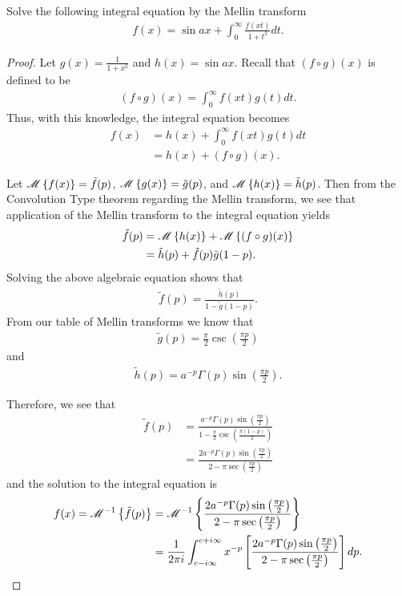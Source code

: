 \begin{problem}{3}
  Solve the following integral equation by the Mellin transform
  \begin{align*}
    f(x) = \sin ax + \int_0^\infty \frac{f(xt)}{1 + t^2} dt.
  \end{align*}
\end{problem}

\begin{proof}
  Let $\displaystyle g(x) = \frac{1}{1+ x^2}$ and $h(x) = \sin ax$. Recall that $(f \circ g)(x)$
  is defined to be
  \begin{align*}
    (f \circ g)(x) = \int_0^\infty f(xt) g(t) dt.
  \end{align*}
  Thus, with this knowledge, the integral equation becomes
  \begin{align*}
    f(x) &= h(x) + \int_0^\infty f(xt) g(t) dt \\
    &= h(x) + (f \circ g)(x).
  \end{align*}

  Let $\mathscr{M}\left\{ {f(x)} \right\} = \tilde{f}(p)$, $\mathscr{M}\left\{ {g(x)} \right\} = \tilde{g}(p)$, and $\mathscr{M}\left\{ {h(x)} \right\} = \tilde{h}(p)$.
  Then from the Convolution Type theorem regarding the Mellin transform, we see
  that application of the Mellin transform to the integral equation yields
  \begin{align*}
    \tilde{f}(p) &= \mathscr{M}\left\{ {h(x)} \right\} + \mathscr{M}\left\{ {(f\circ g)(x)} \right\} \\
    &= \tilde{h}(p) + \tilde{f}(p)\tilde{g}(1-p).
  \end{align*}
  Solving the above algebraic equation shows that
  \begin{align*}
    \tilde{f}(p) = \frac{\tilde{h}(p)}{1 - \tilde{g}(1-p)}.
  \end{align*}
  From our table of Mellin transforms we know that
  \begin{align*}
    \tilde{g}(p) = \frac{\pi}{2} \csc\left(\frac{\pi p}{2}\right)
  \end{align*}
  and
  \begin{align*}
    \tilde{h}(p) = a^{-p}\Gamma(p)\sin\left(\frac{\pi p}{2}\right).
  \end{align*}

  Therefore, we see that
  \begin{align*}
    \tilde{f}(p) &= \frac{a^{-p}\Gamma(p)\sin\left(\frac{\pi p}{2}\right)}{1 - \frac{\pi}{2} \csc\left(\frac{\pi (1-p)}{2}\right)} \\
      &= \frac{2a^{-p}\Gamma(p)\sin\left(\frac{\pi p}{2}\right)}{2 - \pi\sec\left(\frac{\pi p}{2}\right)}
  \end{align*}
  and the solution to the integral equation is
  \begin{align*}
      f(x) = \mathscr{M}^{-1}\left\{ {\tilde{f}(p)} \right\} &= \mathscr{M}^{-1}\left\{ {\frac{2a^{-p}\Gamma(p)\sin\left(\frac{\pi p}{2}\right)}{2 - \pi\sec\left(\frac{\pi p}{2}\right)}} \right\} \\
      &= \frac{1}{2\pi i} \int_{c - i \infty}^{c + i \infty} x^{-p} \left[\frac{2a^{-p}\Gamma(p)\sin\left(\frac{\pi p}{2}\right)}{2 - \pi\sec\left(\frac{\pi p}{2}\right)}\right]dp.
  \end{align*}
\end{proof}
\newpage
